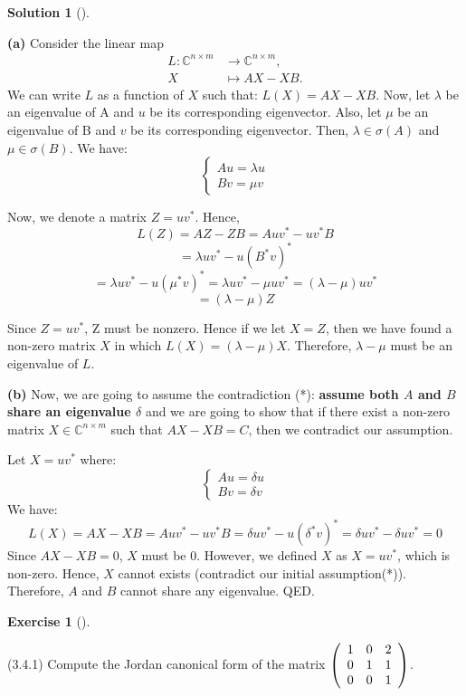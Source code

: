 \documentclass[numbers=enddot,12pt,final,onecolumn,notitlepage]{scrartcl}
\newcounter{exer}
\newcounter{sol}
\theoremstyle{definition}
\newtheorem{exmp}[exer]{Exercise}
\newenvironment{exercise}[1][]
{\begin{exmp}[#1]\begin{leftbar}}
        {\end{leftbar}\end{exmp}}
\newtheorem{solu}[sol]{Solution}
\newenvironment{solution}[1][]
{\begin{solu}[#1]\begin{leftbar}}
        {\end{leftbar}\end{solu}}
\begin{document}
\begin{solution}
	\textbf{(a)}
	Consider the linear map
	\begin{align*}
		L:\mathbb{C}^{n\times m} & \rightarrow\mathbb{C}^{n\times m}, \\
		X                        & \mapsto AX-XB.
	\end{align*}
	We can write $L$ as a function of $X$ such that: $L(X) = AX - XB$. Now, let $\lambda$ be an eigenvalue of A and $u$ be its corresponding eigenvector. Also, let $\mu$ be an eigenvalue of B and $v$ be its corresponding eigenvector. Then, $\lambda \in \sigma(A)$ and $\mu \in \sigma(B)$. We have:
	\[
		\begin{cases}
			Au = \lambda u \\
			Bv = \mu v
		\end{cases}
	\]

	Now, we denote a matrix $Z = uv^{\ast}$. Hence,
	\[
		L(Z) = AZ - ZB = Auv^{\ast} - uv^{\ast}B
	\]
	\[
		= \lambda uv^{\ast} - u(B^{\ast}v)^{\ast}
	\]
	\[
		= \lambda uv^{\ast} - u(\mu^{\ast}v)^{\ast} = \lambda uv^{\ast} - \mu uv^{\ast} = (\lambda - \mu)uv^{\ast}
	\]
	\[
		= (\lambda - \mu)Z
	\]

	Since $Z = uv^{\ast}$, Z must be nonzero. Hence if we let $X = Z$, then we have found a non-zero matrix $X$ in which $L(X) = (\lambda - \mu)X$. Therefore, $\lambda - \mu$ must be an eigenvalue of $L$.

	\textbf{(b)}
	Now, we are going to assume the contradiction (*): \textbf{assume both $A$ and $B$ share an eigenvalue $\delta$} and we are going to show that if there exist a non-zero matrix $X \in \mathbb{C}^{n \times m}$ such that $AX - XB = C$, then we contradict our assumption.

	Let $X = uv^{\ast}$ where:
	\[
		\begin{cases}
			Au = \delta u \\
			Bv = \delta v
		\end{cases}
	\]
	We have:
	\[
		L(X) = AX - XB = Auv^{\ast} - uv^{\ast}B = \delta uv^{\ast} - u(\delta^{\ast}v)^{\ast} = \delta uv^{\ast} - \delta uv^{\ast} = 0
	\]
	Since $AX - XB = 0$, $X$ must be 0. However, we defined $X$ as $X = uv^{\ast}$, which is non-zero. Hence, $X$ cannot exists (contradict our initial assumption(*)). Therefore, $A$ and $B$ cannot share any eigenvalue. QED.

\end{solution}

\begin{exercise}
	 (3.4.1) Compute the Jordan canonical form of the matrix $\left(
		\begin{array}
				[c]{ccc}
				1 & 0 & 2 \\
				0 & 1 & 1 \\
				0 & 0 & 1
			\end{array}
		\right)  $.
\end{exercise}
\end{document}
